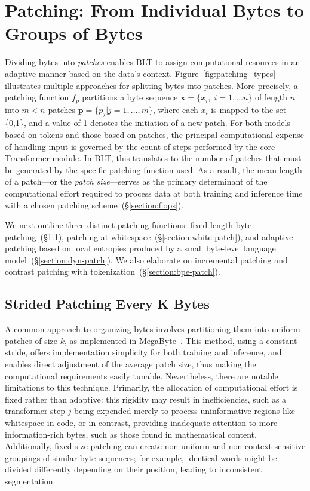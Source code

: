 \section{Patching: From Individual Bytes to Groups of Bytes}
\label{section:patching}

Dividing bytes into \textit{patches} enables {\textsc BLT} to assign computational resources in an adaptive manner based on the data’s context. Figure~\ref{fig:patching_types} illustrates multiple approaches for splitting bytes into patches. More precisely, a patching function $f_p$ partitions a byte sequence $\pmb{x}=\{x_i,|i=1,\ldots n\}$ of length $n$ into $m < n$ patches $\pmb{p}=\{p_j|j=1,\ldots,m\}$, where each $x_i$ is mapped to the set \{0,1\}, and a value of 1 denotes the initiation of a new patch. For both models based on tokens and those based on patches, the principal computational expense of handling input is governed by the count of steps performed by the core Transformer module. In {\textsc BLT}, this translates to the number of patches that must be generated by the specific patching function used. As a result, the mean length of a patch—or the \textit{patch size}—serves as the primary determinant of the computational effort required to process data at both training and inference time with a chosen patching scheme~(\S\ref{section:flops}).

We next outline three distinct patching functions: fixed-length byte patching~(\S\ref{section:static-patch}), patching at whitespace~(\S\ref{section:white-patch}), and adaptive patching based on local entropies produced by a small byte-level language model~(\S\ref{section:dyn-patch}). We also elaborate on incremental patching and contrast patching with tokenization~(\S\ref{section:bpe-patch}).

\subsection{Strided Patching Every K Bytes}
\label{section:static-patch}

A common approach to organizing bytes involves partitioning them into uniform patches of size $k$, as implemented in MegaByte~\citep{yu2023megabyte}. This method, using a constant stride, offers implementation simplicity for both training and inference, and enables direct adjustment of the average patch size, thus making the computational requirements easily tunable. Nevertheless, there are notable limitations to this technique. Primarily, the allocation of computational effort is fixed rather than adaptive: this rigidity may result in inefficiencies, such as a transformer step $j$ being expended merely to process uninformative regions like whitespace in code, or in contrast, providing inadequate attention to more information-rich bytes, such as those found in mathematical content. Additionally, fixed-size patching can create non-uniform and non-context-sensitive groupings of similar byte sequences; for example, identical words might be divided differently depending on their position, leading to inconsistent segmentation.

